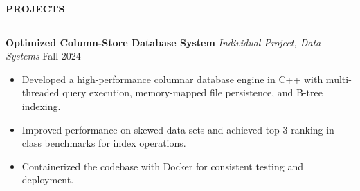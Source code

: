 \documentclass[11pt,a4paper]{article}
\newcommand{\sectionheading}[1]{\vspace{0.2cm}\textbf{\Large #1}\vspace{0.1cm}\hrule\vspace{0.3cm}}
\newcommand{\subheading}[1]{\textbf{#1}}
\newcommand{\daterange}[1]{\hfill{#1}}
\begin{document}
\sectionheading{PROJECTS}

\subheading{Optimized Column-Store Database System}
\textit{Individual Project, Data Systems} \hfill \daterange{Fall 2024}
\begin{itemize}[leftmargin=*,nosep]
    \item Developed a high-performance columnar database engine in C++ with multi-threaded query execution, memory-mapped file persistence, and B-tree indexing.
    \item Improved performance on skewed data sets and achieved top-3 ranking in class benchmarks for index operations.
    \item Containerized the codebase with Docker for consistent testing and deployment.
\end{itemize}


\end{document}
